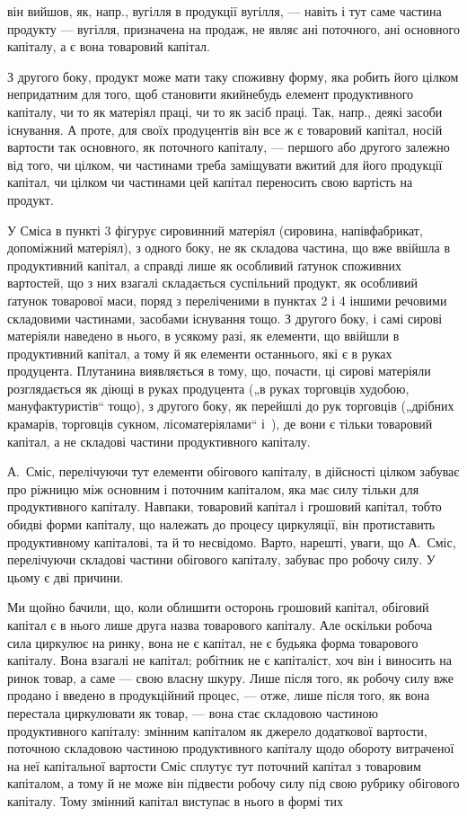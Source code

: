 \parcont{}  %
він вийшов, як, напр., вугілля в продукції вугілля, — навіть і тут саме
частина продукту — вугілля, призначена на продаж, не являє ані поточного,
ані основного капіталу, а є вона товаровий капітал.

З другого боку, продукт може мати таку споживну форму, яка робить
його цілком непридатним для того, щоб становити якийнебудь елемент
продуктивного капіталу, чи то як матеріял праці, чи то як засіб
праці. Так, напр., деякі засоби існування. А проте, для своїх продуцентів
він все ж є товаровий капітал, носій вартости так основного, як поточного
капіталу, — першого або другого залежно від того, чи цілком,
чи частинами треба заміщувати вжитий для його продукції капітал, чи
цілком чи частинами цей капітал переносить свою вартість на продукт.

У Сміса в пункті 3 фігурує сировинний матеріял (сировина, напівфабрикат,
допоміжний матеріял), з одного боку, не як складова частина,
що вже ввійшла в продуктивний капітал, а справді лише як особливий ґатунок
споживних вартостей, що з них взагалі складається суспільний
продукт, як особливий ґатунок товарової маси, поряд з переліченими в
пунктах 2 і 4 іншими речовими складовими частинами, засобами існування
тощо. З другого боку, і самі сирові матеріяли наведено в нього, в
усякому разі, як елементи, що ввійшли в продуктивний капітал, а тому й
як елементи останнього, які є в руках продуцента. Плутанина виявляється в
тому, що, почасти, ці сирові матеріяли розглядається як діющі в руках
продуцента („в руках торговців худобою, мануфактуристів“ тощо), з
другого боку, як перейшлі до рук торговців („дрібних крамарів, торговців
сукном, лісоматеріялами“ і~), де вони є тільки товаровий капітал, а
не складові частини продуктивного капіталу.

А.~Сміс, перелічуючи тут елементи обігового капіталу, в дійсності цілком
забуває про ріжницю між основним і поточним капіталом, яка має
силу тільки для продуктивного капіталу. Навпаки, товаровий капітал і
грошовий капітал, тобто обидві форми капіталу, що належать до процесу
циркуляції, він протиставить продуктивному капіталові, та й то несвідомо.
Варто, нарешті, уваги, що А.~Сміс, перелічуючи складові частини обігового
капіталу, забуває про робочу силу. У цьому є дві причини.

Ми щойно бачили, що, коли облишити осторонь грошовий капітал,
обіговий капітал є в нього лише друга назва товарового капіталу. Але
оскільки робоча сила циркулює на ринку, вона не є капітал, не є будьяка
форма товарового капіталу. Вона взагалі не капітал; робітник не є
капіталіст, хоч він і виносить на ринок товар, а саме — свою власну шкуру.
Лише після того, як робочу силу вже продано і введено в продукційний
процес, — отже, лише після того, як вона перестала циркулювати
як товар, — вона стає складовою частиною продуктивного капіталу: змінним
капіталом як джерело додаткової вартости, поточною складовою
частиною продуктивного капіталу щодо обороту витраченої на неї капітальної
вартости Сміс сплутує тут поточний капітал з товаровим капіталом,
а тому й не може він підвести робочу силу під свою рубрику обігового
капіталу. Тому змінний капітал виступає в нього в формі тих
\parbreak{}  %
